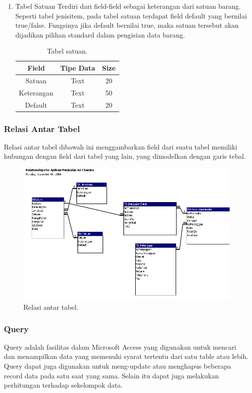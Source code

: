 \documentclass{article}
\renewcommand{\figurename}{Gambar 3.}
\begin{document}
\begin{enumerate}
    \item Tabel Satuan \newline
    Terdiri dari  field-field sebagai keterangan dari satuan barang. Seperti tabel jenisitem, pada tabel satuan terdapat field default yang bernilai true/false. Fungsinya jika default bernilai true, maka satuan tersebut akan dijadikan pilihan standard dalam pengisian data barang.
    \begin{table}[h!]
    \centering
    \begin{tabular}{||c c c ||} 
     \hline
     Field & Tipe Data & Size \\ [0.5ex] 
     \hline\hline
Satuan & Text & 20\\
Keterangan & Text & 50\\
Default & Text & 20\\ [1ex]
     \hline
    \end{tabular}
    \caption{Tabel satuan.}
    \label{table:8}
    \end{table}
\end{enumerate}
\newpage
\subsubsection{Relasi Antar Tabel}
\renewcommand{\figurename}{Gambar 4.}
Relasi antar tabel dibawah ini menggambarkan field dari suatu tabel memiliki hubungan dengan field dari tabel yang lain, yang dimodelkan dengan garis tebal.
\begin{figure}[htp]
    \centering
    \includegraphics[width=14cm]{gambar_4_1.png}
    \caption{Relasi antar tabel.}
    \label{fig:41}
\end{figure}
\newpage

\subsubsection{Query}
Query adalah fasilitas dalam Microsoft Access yang digunakan untuk mencari dan menampilkan data yang memenuhi syarat tertentu dari satu table atau lebih. Query dapat juga digunakan untuk meng-update atau menghapus beberapa record data pada satu saat yang sama. Selain itu dapat juga melakukan perhitungan terhadap sekelompok data.
\end{document}
